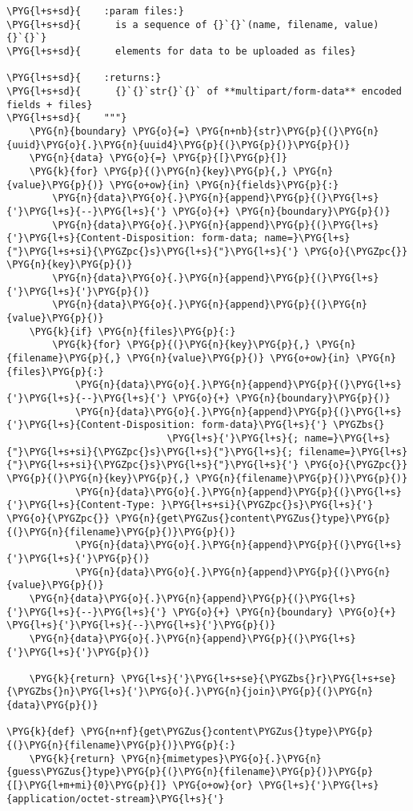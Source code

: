 \begin{Verbatim}[commandchars=\\\{\}]
\PYG{l+s+sd}{    :param files:}
\PYG{l+s+sd}{      is a sequence of {}`{}`(name, filename, value){}`{}`}
\PYG{l+s+sd}{      elements for data to be uploaded as files}

\PYG{l+s+sd}{    :returns:}
\PYG{l+s+sd}{      {}`{}`str{}`{}` of **multipart/form-data** encoded fields + files}
\PYG{l+s+sd}{    """}
    \PYG{n}{boundary} \PYG{o}{=} \PYG{n+nb}{str}\PYG{p}{(}\PYG{n}{uuid}\PYG{o}{.}\PYG{n}{uuid4}\PYG{p}{(}\PYG{p}{)}\PYG{p}{)}
    \PYG{n}{data} \PYG{o}{=} \PYG{p}{[}\PYG{p}{]}
    \PYG{k}{for} \PYG{p}{(}\PYG{n}{key}\PYG{p}{,} \PYG{n}{value}\PYG{p}{)} \PYG{o+ow}{in} \PYG{n}{fields}\PYG{p}{:}
        \PYG{n}{data}\PYG{o}{.}\PYG{n}{append}\PYG{p}{(}\PYG{l+s}{'}\PYG{l+s}{--}\PYG{l+s}{'} \PYG{o}{+} \PYG{n}{boundary}\PYG{p}{)}
        \PYG{n}{data}\PYG{o}{.}\PYG{n}{append}\PYG{p}{(}\PYG{l+s}{'}\PYG{l+s}{Content-Disposition: form-data; name=}\PYG{l+s}{"}\PYG{l+s+si}{\PYGZpc{}s}\PYG{l+s}{"}\PYG{l+s}{'} \PYG{o}{\PYGZpc{}} \PYG{n}{key}\PYG{p}{)}
        \PYG{n}{data}\PYG{o}{.}\PYG{n}{append}\PYG{p}{(}\PYG{l+s}{'}\PYG{l+s}{'}\PYG{p}{)}
        \PYG{n}{data}\PYG{o}{.}\PYG{n}{append}\PYG{p}{(}\PYG{n}{value}\PYG{p}{)}
    \PYG{k}{if} \PYG{n}{files}\PYG{p}{:}
        \PYG{k}{for} \PYG{p}{(}\PYG{n}{key}\PYG{p}{,} \PYG{n}{filename}\PYG{p}{,} \PYG{n}{value}\PYG{p}{)} \PYG{o+ow}{in} \PYG{n}{files}\PYG{p}{:}
            \PYG{n}{data}\PYG{o}{.}\PYG{n}{append}\PYG{p}{(}\PYG{l+s}{'}\PYG{l+s}{--}\PYG{l+s}{'} \PYG{o}{+} \PYG{n}{boundary}\PYG{p}{)}
            \PYG{n}{data}\PYG{o}{.}\PYG{n}{append}\PYG{p}{(}\PYG{l+s}{'}\PYG{l+s}{Content-Disposition: form-data}\PYG{l+s}{'} \PYGZbs{}
                            \PYG{l+s}{'}\PYG{l+s}{; name=}\PYG{l+s}{"}\PYG{l+s+si}{\PYGZpc{}s}\PYG{l+s}{"}\PYG{l+s}{; filename=}\PYG{l+s}{"}\PYG{l+s+si}{\PYGZpc{}s}\PYG{l+s}{"}\PYG{l+s}{'} \PYG{o}{\PYGZpc{}} \PYG{p}{(}\PYG{n}{key}\PYG{p}{,} \PYG{n}{filename}\PYG{p}{)}\PYG{p}{)}
            \PYG{n}{data}\PYG{o}{.}\PYG{n}{append}\PYG{p}{(}\PYG{l+s}{'}\PYG{l+s}{Content-Type: }\PYG{l+s+si}{\PYGZpc{}s}\PYG{l+s}{'} \PYG{o}{\PYGZpc{}} \PYG{n}{get\PYGZus{}content\PYGZus{}type}\PYG{p}{(}\PYG{n}{filename}\PYG{p}{)}\PYG{p}{)}
            \PYG{n}{data}\PYG{o}{.}\PYG{n}{append}\PYG{p}{(}\PYG{l+s}{'}\PYG{l+s}{'}\PYG{p}{)}
            \PYG{n}{data}\PYG{o}{.}\PYG{n}{append}\PYG{p}{(}\PYG{n}{value}\PYG{p}{)}
    \PYG{n}{data}\PYG{o}{.}\PYG{n}{append}\PYG{p}{(}\PYG{l+s}{'}\PYG{l+s}{--}\PYG{l+s}{'} \PYG{o}{+} \PYG{n}{boundary} \PYG{o}{+} \PYG{l+s}{'}\PYG{l+s}{--}\PYG{l+s}{'}\PYG{p}{)}
    \PYG{n}{data}\PYG{o}{.}\PYG{n}{append}\PYG{p}{(}\PYG{l+s}{'}\PYG{l+s}{'}\PYG{p}{)}

    \PYG{k}{return} \PYG{l+s}{'}\PYG{l+s+se}{\PYGZbs{}r}\PYG{l+s+se}{\PYGZbs{}n}\PYG{l+s}{'}\PYG{o}{.}\PYG{n}{join}\PYG{p}{(}\PYG{n}{data}\PYG{p}{)}

\PYG{k}{def} \PYG{n+nf}{get\PYGZus{}content\PYGZus{}type}\PYG{p}{(}\PYG{n}{filename}\PYG{p}{)}\PYG{p}{:}
    \PYG{k}{return} \PYG{n}{mimetypes}\PYG{o}{.}\PYG{n}{guess\PYGZus{}type}\PYG{p}{(}\PYG{n}{filename}\PYG{p}{)}\PYG{p}{[}\PYG{l+m+mi}{0}\PYG{p}{]} \PYG{o+ow}{or} \PYG{l+s}{'}\PYG{l+s}{application/octet-stream}\PYG{l+s}{'}
\end{Verbatim}


